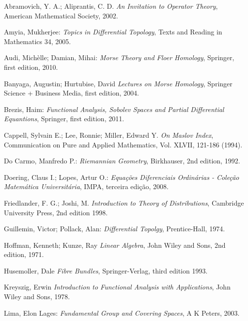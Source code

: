 \documentclass[12pt]{book}
\begin{document}
	\begin{thebibliography}{9}
		Abramovich, Y. A.; Aliprantis, C. D.
		\emph{An Invitation to Operator Theory},
		American Mathematical Society, 2002.
		
		Amyia, Mukherjee:
		\emph{Topics in Differential Topology},
		Texts and Reading in Mathematics 34,
		2005.
		
		Audi, Michèlle; Damian, Mihai:
		\emph{Morse Theory and Floer Homology},
		Springer, first edition,
		2010.
		
		Banyaga, Augustin; Hurtubise, David
		\emph{Lectures on Morse Homology},
		Springer Science + Business Media, first edition,
		2004.
		
		Brezis, Haim:
		\emph{Functional Analysis, Sobolev Spaces and Partial Differential Equantions},
		Springer, first edition,
		2011.
		
		Cappell, Sylvain E.; Lee, Ronnie; Miller, Edward Y.
		\emph{On Maslov Index}, Communication on Pure and Applied Mathematics, Vol. XLVII, 121-186 (1994).
		
		Do Carmo, Manfredo P.:
		\emph{Riemannian Geometry},
		Birkhauser, 2nd edition,
		1992.
		
		Doering, Claus I.; Lopes, Artur O.:
		\emph{Equações Diferenciais Ordinárias - Coleção Matemática Universitária},
		IMPA, terceira edição,
		2008.
		
		Friedlander, F. G.; Joshi, M.
		\emph{Introduction to Theory of Distributions},
		Cambridge University Press, 2nd edition
		1998.
		
		Guillemin, Victor; Pollack, Alan:
		\emph{Differential Topolgy},
		Prentice-Hall,
		1974.	
		
		Hoffman, Kenneth; Kunze, Ray
		\emph{Linear Algebra},
		John Wiley and Sons, 2nd edition, 1971.
		
		Husemoller, Dale
		\emph{Fibre Bundles},
		Springer-Verlag, third edition
		1993.
		
		Kreyszig, Erwin
		\emph{Introduction to Functional Analysis with Applications},
		John Wiley and Sons, 1978.
		
		
		Lima, Elon Lages:
		\emph{Fundamental Group and Covering Spaces},
		A K Peters, 2003.
		

\end{thebibliography}
\end{document}

